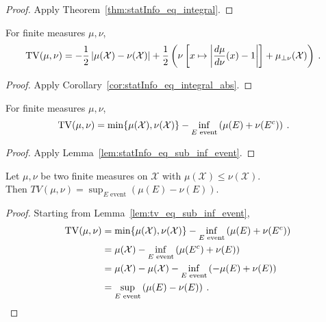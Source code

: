 \begin{proof}%
{}
Apply Theorem~\ref{thm:statInfo_eq_integral}.
\end{proof}


\begin{lemma}
  \label{lem:tv_eq_integral_abs}
  For finite measures $\mu, \nu$,
  \begin{align*}
  \operatorname{TV}(\mu, \nu)
  &= -\frac{1}{2} \left\vert \mu(\mathcal X) - \nu(\mathcal X)\right\vert + \frac{1}{2}\left( \nu\left[ x \mapsto \left\vert \frac{d \mu}{d\nu}(x) - 1 \right\vert \right]  + \mu_{\perp \nu}(\mathcal X)\right)
  \: .
  \end{align*}
\end{lemma}

\begin{proof}%
{}
Apply Corollary~\ref{cor:statInfo_eq_integral_abs}.
\end{proof}


\begin{lemma}
  \label{lem:tv_eq_sub_inf_event}
  For finite measures $\mu, \nu$,
  \begin{align*}
  \operatorname{TV}(\mu, \nu)
  &= \min\{\mu(\mathcal X), \nu(\mathcal X)\} - \inf_{E \text{ event}} \left( \mu(E) + \nu(E^c) \right)
  \: .
  \end{align*}
\end{lemma}

\begin{proof}%
{}
Apply Lemma~\ref{lem:statInfo_eq_sub_inf_event}.
\end{proof}


\begin{theorem}
  \label{thm:tv_eq_sup_sub_measure}
  \uses{}
  Let $\mu, \nu$ be two finite measures on $\mathcal X$ with $\mu(\mathcal X) \leq \nu(\mathcal X)$.\\
  Then $TV(\mu, \nu) = \sup_{E \text{ event}} \left( \mu(E) - \nu(E) \right)$.
\end{theorem}

\begin{proof}%
{}
Starting from Lemma~\ref{lem:tv_eq_sub_inf_event},
\begin{align*}
\operatorname{TV}(\mu, \nu)
&= \min\{\mu(\mathcal X), \nu(\mathcal X)\} - \inf_{E \text{ event}} \left( \mu(E) + \nu(E^c) \right)
\\
&= \mu(\mathcal X) - \inf_{E \text{ event}} \left( \mu(E^c) + \nu(E) \right)
\\
&= \mu(\mathcal X) - \mu(\mathcal X) - \inf_{E \text{ event}} \left( -\mu(E) + \nu(E) \right)
\\
&= \sup_{E \text{ event}} \left( \mu(E) - \nu(E) \right)
\: .
\end{align*}
\end{proof}


